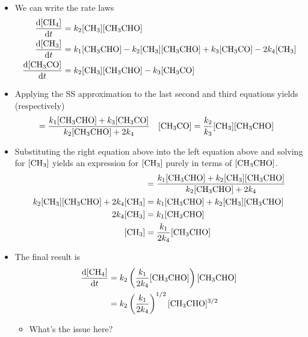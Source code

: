\documentclass[../notes.tex]{subfiles}
\begin{document}
\begin{itemize}
\begin{itemize}
        \item We can write the rate laws
        \begin{align*}
            \dv{[\ce{CH4}]}{t} &= k_2[\ce{CH3}][\ce{CH3CHO}]\\
            \dv{[\ce{CH3}]}{t} &= k_1[\ce{CH3CHO}]-k_2[\ce{CH3}][\ce{CH3CHO}]+k_3[\ce{CH3CO}]-2k_4[\ce{CH3}]\\
            \dv{[\ce{CH3CO}]}{t} &= k_2[\ce{CH3}][\ce{CH3CHO}]-k_3[\ce{CH3CO}]
        \end{align*}
        \item Applying the SS approximation to the last second and third equations yields (respectively)
        \begin{align*}
            [\ce{CH3}] &= \frac{k_1[\ce{CH3CHO}]+k_3[\ce{CH3CO}]}{k_2[\ce{CH3CHO}]+2k_4}&
            [\ce{CH3CO}] &= \frac{k_2}{k_3}[\ce{CH3}][\ce{CH3CHO}]
        \end{align*}
        \item Substituting the right equation above into the left equation above and solving for $[\ce{CH3}]$ yields an expression for $[\ce{CH3}]$ purely in terms of $[\ce{CH3CHO}]$.
        \begin{align*}
            [\ce{CH3}] &= \frac{k_1[\ce{CH3CHO}]+k_2[\ce{CH3}][\ce{CH3CHO}]}{k_2[\ce{CH3CHO}]+2k_4}\\
            k_2[\ce{CH3}][\ce{CH3CHO}]+2k_4[\ce{CH3}] &= k_1[\ce{CH3CHO}]+k_2[\ce{CH3}][\ce{CH3CHO}]\\
            2k_4[\ce{CH3}] &= k_1[\ce{CH3CHO}]\\
            [\ce{CH3}] &= \frac{k_1}{2k_4}[\ce{CH3CHO}]
        \end{align*}
        \item The final result is
        \begin{align*}
            \dv{[\ce{CH4}]}{t} &= k_2\left( \frac{k_1}{2k_4}[\ce{CH3CHO}] \right)[\ce{CH3CHO}]\\
            &= k_2\left( \frac{k_1}{2k_4} \right)^{1/2}[\ce{CH3CHO}]^{3/2}
        \end{align*}
        \begin{itemize}
            \item What's the issue here?
        \end{itemize}
    \end{itemize}
\end{itemize}
\end{document}
